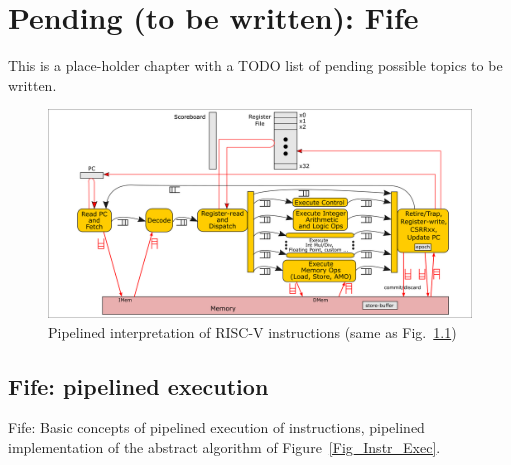 

\chapter{Pending (to be written): Fife}


\setcounter{page}{1}
\renewcommand{\thepage}{\arabic{chapter}-\arabic{page}}

\label{ch_Fife_Pending}


This is a place-holder chapter with a TODO list of pending possible
topics to be written.

\begin{figure}[htbp]
  \centerline{\includegraphics[width=6in,angle=0]{ch030_RISCV_Design_Space/Figures/Fig_Instr_Exec_w_FIFOs}}
  \caption{\label{Fig_Instr_Exec_w_FIFOs}Pipelined interpretation of RISC-V instructions (same as Fig.~\ref{Fig_Instr_Exec_w_FIFOs})}
\end{figure}

\hdivider


\section{Fife: pipelined execution}

Fife: Basic concepts of pipelined execution of instructions, {\ie}
pipelined implementation of the abstract algorithm of
Figure~\ref{Fig_Instr_Exec}.

